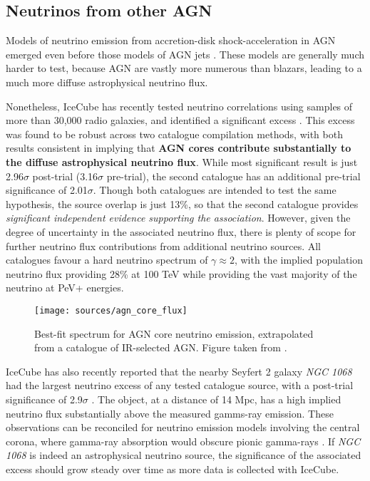 \subsection*{Neutrinos from other AGN}

Models of neutrino emission from accretion-disk shock-acceleration in AGN emerged even before those models of AGN jets . These models are generally much harder to test, because AGN are vastly more numerous than blazars, leading to a much more diffuse astrophysical neutrino flux. 

Nonetheless, IceCube has recently tested neutrino correlations using samples of more than 30,000 radio galaxies, and identified a significant excess . This excess was found to be robust across two catalogue compilation methods, with both results consistent in implying that \textbf{AGN cores contribute substantially to the diffuse astrophysical neutrino flux}. While most significant result is just 2.96$\sigma$ post-trial (3.16$\sigma$ pre-trial), the second catalogue has an additional pre-trial significance of 2.01$\sigma$. Though both catalogues are intended to test the same hypothesis, the source overlap is just 13\%, so that the second catalogue provides \emph{significant independent evidence supporting the association}. However, given the degree of uncertainty in the associated neutrino flux, there is plenty of scope for further neutrino flux contributions from additional neutrino sources. All catalogues favour a hard neutrino spectrum of $\gamma \approx 2$, with the implied population neutrino flux providing 28\% at 100 TeV while providing the vast majority of the neutrino at PeV+ energies.


\begin{figure}[!ht]
	\centering \texttt{[image: sources/agn\_core\_flux]}
	\caption{Best-fit spectrum for AGN core neutrino emission, extrapolated from a catalogue of IR-selected AGN. Figure taken from \cite{federica_thesis}.}
	\label{fig:agn_core_flux}
\end{figure}

IceCube has also recently reported that the nearby Seyfert 2 galaxy \emph{NGC 1068} had the largest neutrino excess of any tested catalogue source, with a post-trial significance of 2.9$\sigma$ . The object, at a distance of 14 Mpc, has a high implied neutrino flux substantially above the measured gamms-ray emission. These observations can be reconciled for neutrino emission models involving the central corona, where gamma-ray absorption would obscure pionic gamma-rays . If \emph{NGC 1068} is indeed an astrophysical neutrino source, the significance of the associated excess should grow steady over time as more data is collected with IceCube.

